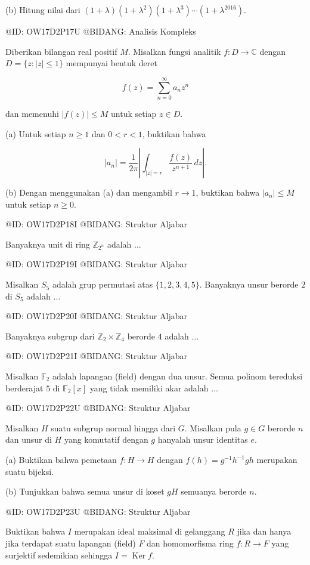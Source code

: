 (b) Hitung nilai dari $(1+\lambda)(1+\lambda^2)(1+\lambda^3)\cdots(1+\lambda^{2016})$.

@ID: OW17D2P17U
@BIDANG: Analisis Kompleks

Diberikan bilangan real positif $M$. Misalkan fungsi analitik $f:D\to\mathbb C$ dengan $D=\{z:|z|\leq 1\}$ mempunyai bentuk deret

$$
f(z)=\sum_{n=0}^{\infty} a_nz^n
$$

dan memenuhi $|f(z)|\leq M$ untuk setiap $z\in D$.

(a) Untuk setiap $n\geq 1$ dan $0<r<1$, buktikan bahwa

$$
|a_n|=\frac{1}{2\pi}\left|\int_{|z|=r}\frac{f(z)}{z^{n+1}}\,dz\right|.
$$

(b) Dengan menggunakan (a) dan mengambil $r\to 1$, buktikan bahwa $|a_n|\leq M$ untuk setiap $n\geq 0$.

@ID: OW17D2P18I
@BIDANG: Struktur Aljabar

Banyaknya unit di ring $\mathbb Z_{2^n}$ adalah $\ldots$

@ID: OW17D2P19I
@BIDANG: Struktur Aljabar

Misalkan $S_5$ adalah grup permutasi atas $\{1,2,3,4,5\}$. Banyaknya unsur berorde $2$ di $S_5$ adalah $\ldots$

@ID: OW17D2P20I
@BIDANG: Struktur Aljabar

Banyaknya subgrup dari $\mathbb Z_2\times\mathbb Z_4$ berorde $4$ adalah $\ldots$

@ID: OW17D2P21I
@BIDANG: Struktur Aljabar

Misalkan $\mathbb F_2$ adalah lapangan (field) dengan dua unsur. Semua polinom tereduksi berderajat $5$ di $\mathbb F_2[x]$ yang tidak memiliki akar adalah $\ldots$

@ID: OW17D2P22U
@BIDANG: Struktur Aljabar

Misalkan $H$ suatu subgrup normal hingga dari $G$. Misalkan pula $g\in G$ berorde $n$ dan unsur di $H$ yang komutatif dengan $g$ hanyalah unsur identitas $e$.

(a) Buktikan bahwa pemetaan $f:H\to H$ dengan $f(h)=g^{-1}h^{-1}gh$ merupakan suatu bijeksi.

(b) Tunjukkan bahwa semua unsur di koset $gH$ semuanya berorde $n$.

@ID: OW17D2P23U
@BIDANG: Struktur Aljabar

Buktikan bahwa $I$ merupakan ideal maksimal di gelanggang $R$ jika dan hanya jika terdapat suatu lapangan (field) $F$ dan homomorfisma ring $f:R\to F$ yang surjektif sedemikian sehingga $I=\operatorname{Ker} f$.